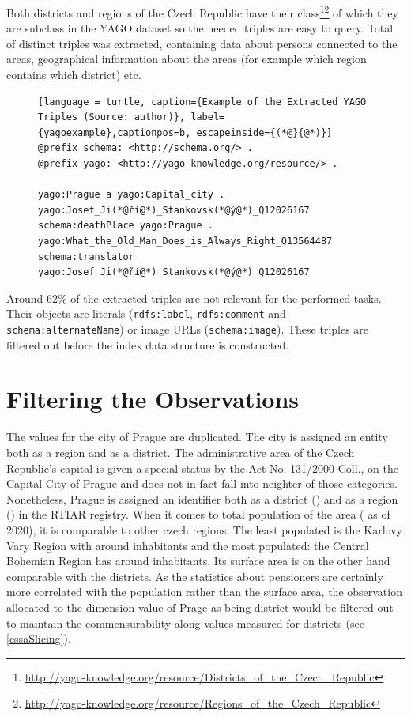 Both districts and regions of the Czech Republic have their class\footnote{\href{http://yago-knowledge.org/resource/Districts\_of\_the_Czech\_Republic}{http://yago-knowledge.org/resource/Districts\_of\_the\_Czech\_Republic}}\footnote{\href{http://yago-knowledge.org/resource/Regions\_of\_the\_Czech\_Republic}{http://yago-knowledge.org/resource/Regions\_of\_the\_Czech\_Republic}} of which they are subclass in the YAGO dataset so the needed triples are easy to query. Total of  distinct triples was extracted, containing data about persons connected to the areas, geographical information about the areas (for example which region contains which district) etc.

\begin{figure}[h]
\begin{lstlisting}[language = turtle, caption={Example of the Extracted YAGO Triples (Source: author)}, label={yagoexample},captionpos=b, escapeinside={(*@}{@*)}]
@prefix schema: <http://schema.org/> .
@prefix yago: <http://yago-knowledge.org/resource/> .

yago:Prague a yago:Capital_city .
yago:Josef_Ji(*@ří@*)_Stankovsk(*@ý@*)_Q12026167 schema:deathPlace yago:Prague .
yago:What_the_Old_Man_Does_is_Always_Right_Q13564487 schema:translator yago:Josef_Ji(*@ří@*)_Stankovsk(*@ý@*)_Q12026167
\end{lstlisting}
\end{figure}

Around 62\% of the extracted triples are not relevant for the performed tasks. Their objects are literals (\verb|rdfs:label|, \verb|rdfs:comment| and \verb|schema:alternateName|) or image URLs (\verb|schema:image|). These triples are filtered out before the index data structure is constructed.

\section{Filtering the Observations}

The values for the city of Prague are duplicated. The city is assigned an entity both as a region and as a district. The administrative area of the Czech Republic's capital is given a special status by the Act No. 131/2000 Coll., on the Capital City of Prague and does not in fact fall into neighter of those categories. Nonetheless, Prague is assigned an identifier both as a district () and as a region () in the RTIAR registry. When it comes to total population of the area ( as of 2020), it is comparable to other czech regions. The least populated is the Karlovy Vary Region with around  inhabitants and the most populated: the Central Bohemian Region has around  inhabitants. Its surface area is on the other hand comparable with the districts. As the statistics about pensioners are certainly more correlated with the population rather than the surface area, the observation allocated to the dimension value of Prage as being district would be filtered out to maintain the commensurability along values measured for districts (see \ref{cssaSlicing}).

